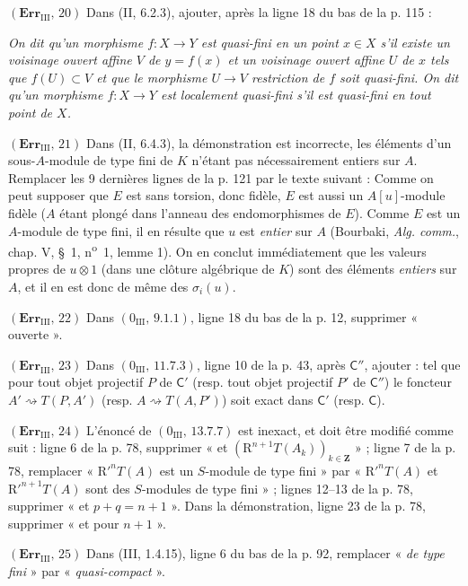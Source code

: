 \noindent\textbf{$(\mathbf{Err}_{\mathrm{III}},\,20)$} Dans (II, 6.2.3),
ajouter, après la ligne 18 du bas de la p. 115 :

\emph{On dit qu'un morphisme $f:X\to Y$ est quasi-fini en un point $x\in X$
s'il existe un voisinage ouvert affine $V$ de $y=f(x)$ et un voisinage ouvert
affine $U$ de $x$ tels que $f(U)\subset V$ et que le morphisme $U\to V$
restriction de $f$ soit quasi-fini. On dit qu'un morphisme $f:X\to Y$ est
localement quasi-fini s'il est quasi-fini en tout point de $X$.}

\noindent\textbf{$(\mathbf{Err}_{\mathrm{III}},\,21)$} Dans (II, 6.4.3), la
démonstration est incorrecte, les éléments d'un sous-$A$-module de type fini de
$K$ n'étant pas nécessairement entiers sur $A$. Remplacer les 9 dernières lignes
de la p. 121 par le texte suivant : Comme on peut supposer que $E$ est sans
torsion, donc fidèle, $E$ est aussi un $A[u]$-module fidèle ($A$ étant plongé
dans l'anneau des endomorphismes de $E$). Comme $E$ est un $A$-module de type
fini, il en résulte que $u$ est \emph{entier} sur $A$ (Bourbaki,
\emph{Alg. comm.}, chap. V, \S~1, n\textsuperscript{o}~1, lemme 1). On en
conclut immédiatement que les valeurs propres de $u\otimes1$ (dans une clôture
algébrique de $K$) sont des éléments \emph{entiers} sur $A$, et il en est donc
de même des $\sigma_i(u)$.

\noindent\textbf{$(\mathbf{Err}_{\mathrm{III}},\,22)$} Dans
$(0_{\mathrm{III}},\,9.1.1)$, ligne 18 du bas de la p. 12, supprimer
« ouverte ».

\noindent\textbf{$(\mathbf{Err}_{\mathrm{III}},\,23)$} Dans
$(0_{\mathrm{III}},\,11.7.3)$, ligne 10 de la p. 43, après $\mathsf C''$,
ajouter : tel que pour tout objet projectif $P$ de $\mathsf C'$ (resp. tout
objet projectif $P'$ de $\mathsf C''$) le foncteur
$A'\rightsquigarrow T(P,A')$ (resp. $A\rightsquigarrow T(A,P')$) soit exact
dans $\mathsf C'$ (resp. $\mathsf C$).

\noindent\textbf{$(\mathbf{Err}_{\mathrm{III}},\,24)$} L'énoncé de
$(0_{\mathrm{III}},\,13.7.7)$ est inexact, et doit être modifié comme suit :
ligne 6 de la p. 78, supprimer « et
$(\mathrm R^{n+1}T(A_k))_{k\in\mathbf Z}$ » ; ligne 7 de la p. 78, remplacer
« $\mathrm R'^nT(A)$ est un $S$-module de type fini » par
« $\mathrm R'^nT(A)$ et $\mathrm R'^{n+1}T(A)$ sont des $S$-modules de type
fini » ; lignes 12--13 de la p. 78, supprimer « et $p+q=n+1$ ». Dans la
démonstration, ligne 23 de la p. 78, supprimer « et pour $n+1$ ».

\noindent\textbf{$(\mathbf{Err}_{\mathrm{III}},\,25)$} Dans (III, 1.4.15),
ligne 6 du bas de la p. 92, remplacer « \emph{de type fini} » par
« \emph{quasi-compact} ».

